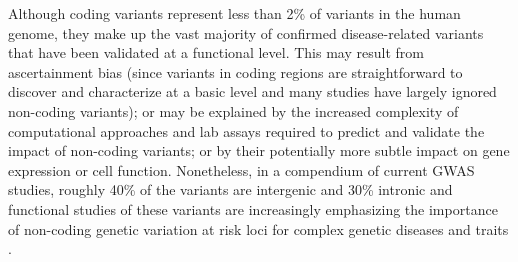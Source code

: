 Although coding variants represent less than 2\% of variants in the human genome, they make up the vast majority of confirmed disease-related variants that have been validated at a functional level. This may result from ascertainment bias (since variants in coding regions are straightforward to discover and characterize at a basic level and many studies have largely ignored non-coding variants); or may be explained by the increased complexity of computational approaches and lab assays required to predict and validate the impact of non-coding variants; or by their potentially more subtle impact on gene expression or cell function. Nonetheless, in a compendium of current GWAS studies, roughly 40\% of the variants are intergenic and 30\% intronic and functional studies of these variants are increasingly emphasizing the importance of non-coding genetic variation at risk loci for complex genetic diseases and traits \cite{hindorff2009potential}.

